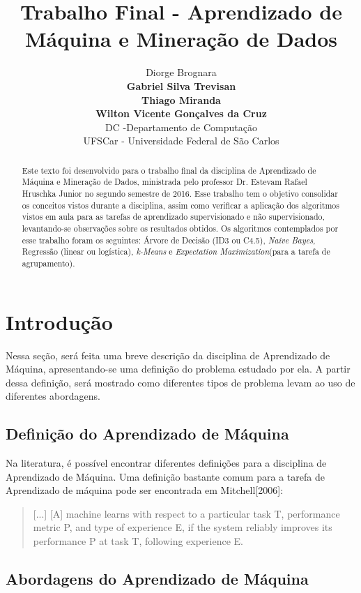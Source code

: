 \documentclass{article}
\title{Trabalho Final - Aprendizado de Máquina e Mineração de Dados}
\author{
Diorge Brognara \\
{\bf Gabriel Silva Trevisan}  \\
{\bf Thiago Miranda} \\
{\bf Wilton Vicente Gonçalves da Cruz} \\
DC -Departamento de Computação \\
UFSCar - Universidade Federal de São Carlos \\
}
\begin{document}
\maketitle

\begin{abstract}
Este texto foi desenvolvido para o trabalho final da disciplina de Aprendizado de Máquina e Mineração de Dados,
ministrada pelo professor Dr. Estevam Rafael Hruschka Junior no segundo semestre de 2016.
Esse trabalho tem o objetivo consolidar os conceitos vistos durante a disciplina,
assim como verificar a aplicação dos algoritmos vistos em aula para as tarefas de aprendizado supervisionado e não supervisionado,
levantando-se observações sobre os resultados obtidos.
Os algoritmos contemplados por esse trabalho foram os seguintes:
Árvore de Decisão (ID3 ou C4.5), {\it Naive Bayes}, Regressão (linear ou logística),
{\it k-Means} e {\it Expectation Maximization}(para a tarefa de agrupamento).
\end{abstract}

\section{Introdução}

Nessa seção, será feita uma breve descrição da disciplina de Aprendizado de Máquina,
apresentando-se uma definição do problema estudado por ela.
A partir dessa definição, será mostrado como diferentes tipos de problema levam ao uso de diferentes abordagens.

\subsection{Definição do Aprendizado de Máquina}

Na literatura, é possível encontrar diferentes definições para a disciplina de Aprendizado de Máquina.
Uma definição bastante comum para a tarefa de Aprendizado de máquina pode ser encontrada em Mitchell[2006]:
\begin{quote}
[...] [A] machine learns with respect to a particular task T, performance metric P, and type of experience E, if the system reliably improves its performance P at task T, following experience E. \cite{mitchell06}
\end{quote}


\subsection{Abordagens do Aprendizado de Máquina}
\end{document}

